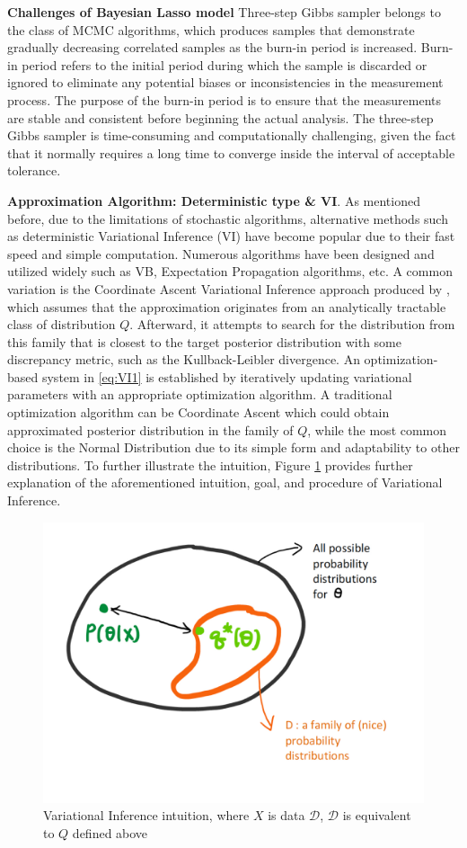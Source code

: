 \textbf{Challenges of Bayesian Lasso model}
Three-step Gibbs sampler belongs to the class of MCMC algorithms, which produces samples that demonstrate gradually decreasing correlated samples as the burn-in period is increased. Burn-in period refers to the initial period during which the sample is discarded or ignored to eliminate any potential biases or inconsistencies in the measurement process. The purpose of the burn-in period is to ensure that the measurements are stable and consistent before beginning the actual analysis. The three-step Gibbs sampler is time-consuming and computationally challenging, given the fact that it normally requires a long time to converge inside the interval of acceptable tolerance.

\textbf{Approximation Algorithm: Deterministic type \& VI}.
As mentioned before, due to the limitations of stochastic algorithms, alternative methods such as deterministic Variational Inference (VI) have become popular due to their fast speed and simple computation.
Numerous algorithms have been designed and utilized widely such as VB, Expectation Propagation algorithms, etc. A common variation is the Coordinate Ascent Variational Inference approach produced by \cite{Blei2003LDA}, which assumes that the approximation originates from an analytically tractable class of distribution $Q$. Afterward, it attempts to search for the distribution from this family that is closest to the target posterior distribution with some discrepancy metric, such as the Kullback-Leibler divergence. An optimization-based system in \autoref{eq:VI1} is established by iteratively updating variational parameters with an appropriate optimization algorithm. A traditional optimization algorithm can be Coordinate Ascent which could obtain approximated posterior distribution in the family of $Q$, while the most common choice is the Normal Distribution due to its simple form and adaptability to other distributions.
To further illustrate the intuition, Figure \ref{fig:VIoptimization} provides further explanation of the aforementioned intuition, goal, and procedure of Variational Inference.
\begin{figure}[H]
	\center
	\includegraphics[scale = 0.2]{VIoptimization}
	\caption{Variational Inference intuition, where $X$ is data $\mathcal{D}$, $\mathcal{D}$ is equivalent to $Q$ defined above}
	\label{fig:VIoptimization}
\end{figure}
